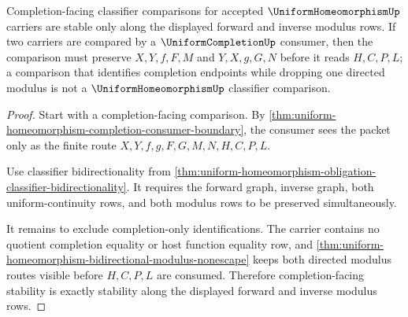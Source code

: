 \begin{theorem}
\label{thm:uniform-homeomorphism-completion-classifier-stability}
Completion-facing classifier comparisons for accepted $\UniformHomeomorphismUp$ carriers are stable only along the displayed forward and inverse modulus rows. If two carriers are compared by a $\UniformCompletionUp$ consumer, then the comparison must preserve $X,Y,f,F,M$ and $Y,X,g,G,N$ before it reads $H,C,P,L$; a comparison that identifies completion endpoints while dropping one directed modulus is not a $\UniformHomeomorphismUp$ classifier comparison.
\end{theorem}
\begin{proof}
Start with a completion-facing comparison. By \autoref{thm:uniform-homeomorphism-completion-consumer-boundary}, the consumer sees the packet only as the finite route $X,Y,f,g,F,G,M,N,H,C,P,L$.

Use classifier bidirectionality from \autoref{thm:uniform-homeomorphism-obligation-classifier-bidirectionality}. It requires the forward graph, inverse graph, both uniform-continuity rows, and both modulus rows to be preserved simultaneously.

It remains to exclude completion-only identifications. The carrier contains no quotient completion equality or host function equality row, and \autoref{thm:uniform-homeomorphism-bidirectional-modulus-nonescape} keeps both directed modulus routes visible before $H,C,P,L$ are consumed. Therefore completion-facing stability is exactly stability along the displayed forward and inverse modulus rows.
\end{proof}

